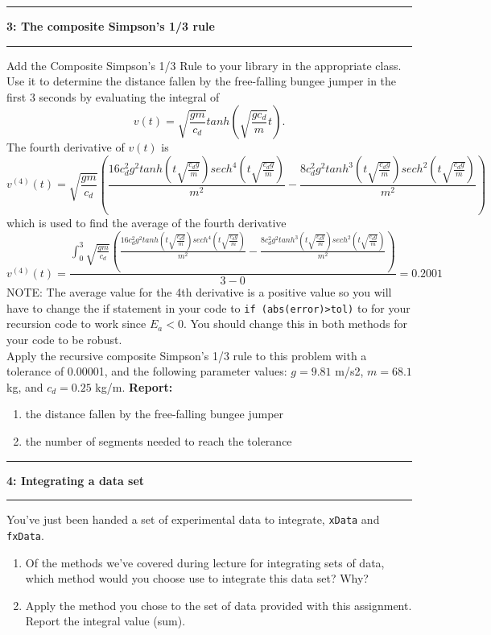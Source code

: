 \documentclass[11pt]{article}
\newcommand\question[2]{\vspace{.25in}\hrule\textbf{#1: #2}\vspace{.5em}\hrule\vspace{.10in}}
\begin{document}
\newpage
\question{3}{The composite Simpson's 1/3 rule}
Add the Composite Simpson's 1/3 Rule to your library in the appropriate class. Use it to determine the distance fallen by the free-falling bungee jumper in the first 3 seconds by evaluating the integral of
$$v(t) = \sqrt{\frac{gm}{c_d}}tanh\left(\sqrt{\frac{gc_d}{m}}t\right). $$
The fourth derivative of $v(t)$ is 
$$v^{(4)}(t) =\sqrt{\frac{gm}{c_d}}\left(\frac{16c_d^2g^2tanh\left(t\sqrt{\frac{c_dg}{m}}\right)sech^4\left(t\sqrt{\frac{c_dg}{m}}\right)}{m^2} -\frac{8c_d^2g^2tanh^3\left(t\sqrt{\frac{c_dg}{m}}\right)sech^2\left(t\sqrt{\frac{c_dg}{m}}\right)}{m^2} \right)$$
which is used to find the average of the fourth derivative
$$v^{(4)}(t) = \frac{\int_{0}^{3}\sqrt{\frac{gm}{c_d}}\left(\frac{16c_d^2g^2tanh\left(t\sqrt{\frac{c_dg}{m}}\right)sech^4\left(t\sqrt{\frac{c_dg}{m}}\right)}{m^2} -\frac{8c_d^2g^2tanh^3\left(t\sqrt{\frac{c_dg}{m}}\right)sech^2\left(t\sqrt{\frac{c_dg}{m}}\right)}{m^2} \right)}{3-0} = 0.2001$$ 
NOTE: The average value for the 4th derivative is a positive value so you will have to change the if statement in your code to \texttt{if (abs(error)>tol)} to for your recursion code to work since $E_a < 0$. You should change this in both methods for your code to be robust.\\\vspace{0.5cm}
Apply the recursive composite Simpson's 1/3 rule to this problem with a tolerance of 0.00001, and the following parameter values: $g = 9.81$ m/s2, $m = 68.1$ kg, and
$c_d = 0.25$ kg/m. \textbf{Report:} 
\begin{enumerate}
	\item the distance fallen by the free-falling bungee jumper
	\item the number of segments needed to reach the tolerance
\end{enumerate}
\vspace{0.5cm}

\question{4}{Integrating a data set }
You've just been handed a set of experimental data to integrate, \texttt{xData} and \texttt{fxData}. 
\begin{enumerate}[label = (\alph*)]
	\item Of the methods we've covered during lecture for integrating sets of data, which method would you choose use to integrate this data set? Why? \vspace{2cm}
	\item Apply the method you chose to the set of data provided with this assignment. Report the integral value (sum).
\end{enumerate}
\end{document}
